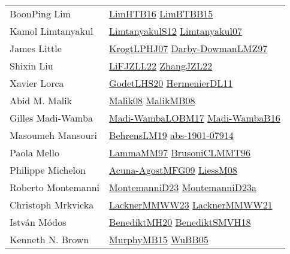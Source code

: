 {\begin{longtable}{p{4cm}p{20cm}}
BoonPing Lim & \href{papers/LimHTB16.pdf}{LimHTB16}\cite{LimHTB16} \href{papers/LimBTBB15.pdf}{LimBTBB15}\cite{LimBTBB15} \\
Kamol Limtanyakul & \href{articles/LimtanyakulS12.pdf}{LimtanyakulS12}\cite{LimtanyakulS12} \href{papers/Limtanyakul07.pdf}{Limtanyakul07}\cite{Limtanyakul07} \\
James Little & \href{papers/KrogtLPHJ07.pdf}{KrogtLPHJ07}\cite{KrogtLPHJ07} \href{articles/Darby-DowmanLMZ97.pdf}{Darby-DowmanLMZ97}\cite{Darby-DowmanLMZ97} \\
Shixin Liu & \href{papers/LiFJZLL22.pdf}{LiFJZLL22}\cite{LiFJZLL22} \href{papers/ZhangJZL22.pdf}{ZhangJZL22}\cite{ZhangJZL22} \\
Xavier Lorca & \href{papers/GodetLHS20.pdf}{GodetLHS20}\cite{GodetLHS20} \href{papers/HermenierDL11.pdf}{HermenierDL11}\cite{HermenierDL11} \\
Abid M. Malik & \href{}{Malik08}\cite{Malik08} \href{}{MalikMB08}\cite{MalikMB08} \\
Gilles Madi{-}Wamba & \href{papers/Madi-WambaLOBM17.pdf}{Madi-WambaLOBM17}\cite{Madi-WambaLOBM17} \href{papers/Madi-WambaB16.pdf}{Madi-WambaB16}\cite{Madi-WambaB16} \\
Masoumeh Mansouri & \href{papers/BehrensLM19.pdf}{BehrensLM19}\cite{BehrensLM19} \href{articles/abs-1901-07914.pdf}{abs-1901-07914}\cite{abs-1901-07914} \\
Paola Mello & \href{articles/LammaMM97.pdf}{LammaMM97}\cite{LammaMM97} \href{papers/BrusoniCLMMT96.pdf}{BrusoniCLMMT96}\cite{BrusoniCLMMT96} \\
Philippe Michelon & \href{papers/Acuna-AgostMFG09.pdf}{Acuna-AgostMFG09}\cite{Acuna-AgostMFG09} \href{articles/LiessM08.pdf}{LiessM08}\cite{LiessM08} \\
Roberto Montemanni & \href{articles/MontemanniD23.pdf}{MontemanniD23}\cite{MontemanniD23} \href{articles/MontemanniD23a.pdf}{MontemanniD23a}\cite{MontemanniD23a} \\
Christoph Mrkvicka & \href{articles/LacknerMMWW23.pdf}{LacknerMMWW23}\cite{LacknerMMWW23} \href{papers/LacknerMMWW21.pdf}{LacknerMMWW21}\cite{LacknerMMWW21} \\
Istv{\'{a}}n M{\'{o}}dos & \href{articles/BenediktMH20.pdf}{BenediktMH20}\cite{BenediktMH20} \href{papers/BenediktSMVH18.pdf}{BenediktSMVH18}\cite{BenediktSMVH18} \\
Kenneth N. Brown & \href{papers/MurphyMB15.pdf}{MurphyMB15}\cite{MurphyMB15} \href{papers/WuBB05.pdf}{WuBB05}\cite{WuBB05} \\

\end{longtable}}
